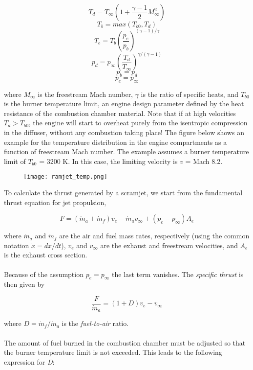 \documentclass[Orbiter Developer Manual.tex]{subfiles}
\begin{document}
\[ T_{d} = T_{\infty}\left(1 + \frac{\gamma - 1}{2} M_{\infty}^{2}\right) \]
\[ T_{b} = max(T_{b0},T_{d}) \]
\[ T_{e} = T_{b}\left(\frac{p_{e}}{p_{b}}\right)^{(\gamma - 1) / \gamma} \]
\[ p_{d} = p_{\infty}\left(\frac{T_{d}}{T_{\infty}}\right)^{\gamma / (\gamma - 1)} \]
\[ p_{b} = p_{d} \]
\[ p_{e} = p_{\infty} \]

\noindent
where $M_{\infty}$ is the freestream Mach number, $\gamma$ is the ratio of specific heats, and $T_{b0}$ is the burner temperature limit, an engine design parameter defined by the heat resistance of the combustion chamber material. Note that if at high velocities $T_{d} > T_{b0}$, the engine will start to overheat purely from the isentropic compression in the diffuser, without any combustion taking place! The figure below shows an example for the temperature distribution in the engine compartments as a function of freestream Mach number. The example assumes a burner temperature limit of $T_{b0}$ = 3200 K. In this case, the limiting velocity is $v$ = Mach 8.2.

\begin{figure}[H]
  \centering
  \texttt{[image: ramjet\_temp.png]}
\end{figure}

\noindent
To calculate the thrust generated by a scramjet, we start from the fundamental thrust equation for jet propulsion,

\[ F = (\dot{m}_{a} + \dot{m}_{f})v_{e} - \dot{m}_{a} v_{\infty} + (p_{e} - p_{\infty})A_{e} \]

\noindent
where $\dot{m}_{a}$ and $\dot{m}_{f}$ are the air and fuel mass rates, respectively (using the common notation $\dot{x} = dx / dt$), $v_{e}$ and $v_{\infty}$ are the exhaust and freestream velocities, and $A_{e}$ is the exhaust cross section.\\
\\
Because of the assumption $p_{e} = p_{\infty}$ the last term vanishes. The \textit{specific thrust} is then given by

\[ \frac{F}{\dot{m}_{a}} = (1 + D)v_{e} - v_{\infty} \]

\noindent
where $D = \dot{m}_{f} / \dot{m}_{a}$ is the \textit{fuel-to-air} ratio.\\
\\
The amount of fuel burned in the combustion chamber must be adjusted so that the burner temperature limit is not exceeded. This leads to the following expression for \textit{D}:
\end{document}
